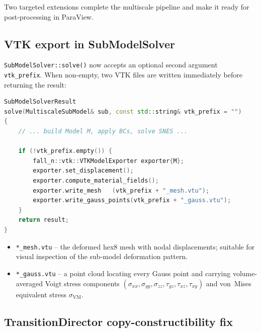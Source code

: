 Two targeted extensions complete the multiscale pipeline and make it ready
for post-processing in ParaView.

\subsection{VTK export in SubModelSolver}

\texttt{SubModelSolver::solve()} now accepts an optional second argument
\texttt{vtk\_prefix}.  When non-empty, two VTK files are written immediately
before returning the result:

\begin{lstlisting}[language=C++,caption={SubModelSolver.hh -- VTK export},
                   label={lst:sub_vtk}]
SubModelSolverResult
solve(MultiscaleSubModel& sub, const std::string& vtk_prefix = "")
{
    // ... build Model M, apply BCs, solve SNES ...

    if (!vtk_prefix.empty()) {
        fall_n::vtk::VTKModelExporter exporter{M};
        exporter.set_displacement();
        exporter.compute_material_fields();
        exporter.write_mesh   (vtk_prefix + "_mesh.vtu");
        exporter.write_gauss_points(vtk_prefix + "_gauss.vtu");
    }
    return result;
}
\end{lstlisting}

\begin{itemize}
  \item \texttt{*\_mesh.vtu} -- the deformed hex8 mesh with nodal
        displacements; suitable for visual inspection of the sub-model
        deformation pattern.
  \item \texttt{*\_gauss.vtu} -- a point cloud locating every Gauss
        point and carrying volume-averaged Voigt stress components
        $(\sigma_{xx}, \sigma_{yy}, \sigma_{zz}, \tau_{yz}, \tau_{xz},
        \tau_{xy})$ and von~Mises equivalent stress $\sigma_\text{VM}$.
\end{itemize}

\subsection{TransitionDirector copy-constructibility fix}

